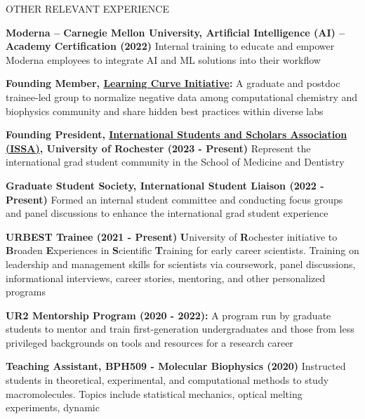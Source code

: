 \documentclass{resume} %
\begin{document}

\begin{rSection}{OTHER RELEVANT EXPERIENCE}
   \vspace{-1.25em}
   \item \textbf{Moderna – Carnegie Mellon University, Artificial Intelligence (AI) – Academy Certification (2022)} {
      Internal training to educate and empower Moderna employees to integrate AI and ML solutions into their workflow}
   \item \textbf{Founding Member,  \href{https://learning-curve-initiative.github.io/about/}{Learning Curve Initiative}:} {A graduate and postdoc trainee-led group to normalize negative data among computational chemistry and biophysics community and share hidden best practices within diverse labs}
   \item \textbf{Founding President, \href{https://ccc.rochester.edu/issa/home/}{International Students and Scholars Association (ISSA)}, University of Rochester (2023 - Present)} {Represent the international grad student community in the School of Medicine and Dentistry}
   \item \textbf{Graduate Student Society, International Student Liaison (2022 - Present)} {Formed an internal student committee and conducting focus groups and panel discussions to enhance the international grad student experience}
   \item \textbf{URBEST Trainee (2021 - Present)} {\textbf{U}niversity of \textbf{R}ochester initiative to \textbf{B}roaden \textbf{E}xperiences in \textbf{S}cientific \textbf{T}raining for early career scientists. Training on leadership and management skills for scientists via coursework, panel discussions, informational interviews, career stories, mentoring, and other personalized programs}
   \item \textbf{UR2 Mentorship Program (2020 - 2022):} {A program run by graduate students to mentor and train first-generation undergraduates and those from less privileged backgrounds on tools and resources for a research career}
   \item \textbf{Teaching Assistant, BPH509 - Molecular Biophysics (2020)} {Instructed students in theoretical, experimental, and computational methods to study macromolecules. Topics include statistical mechanics, optical melting experiments, dynamic
}
\end{rSection}
\end{document}
